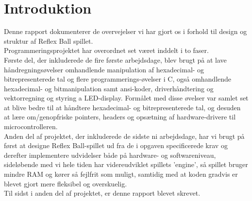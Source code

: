 \chapter{Introduktion}
Denne rapport dokumenterer de overvejelser vi har gjort os i forhold til design og struktur af Reflex Ball spillet. \\
Programmeringsprojektet har overordnet set været inddelt i to faser.\\

Første del, der inkluderede de fire første arbejdsdage, blev brugt på at lave håndregningsøvelser omhandlende manipulation af hexadecimal- og bitrepresenterede tal og flere programmerings-øvelser i C, også omhandlende hexadecimal- og bitmanipulation samt ansi-koder, driverhåndtering og vektorregning og styring a LED-display. Formålet med disse øvelser var samlet set at blive bedre til at håndtere hexadecimal- og bitrepresenterede tal, og desuden at lære om/genopfriske pointers, headers og opsætning af hardware-drivere til microcontrolleren.\\

Anden del af projektet, der inkluderede de sidste ni arbejdsdage, har vi brugt på først at designe Reflex Ball-spillet ud fra de i opgaven specificerede krav og derefter implementere udvidelser både på hardware- og softwareniveau, sideløbende med vi hele tiden har videreudviklet spillets 'engine', så spillet bruger mindre RAM og kører så fejlfrit som muligt, samtidig med at koden gradvis er blevet gjort mere fleksibel og overskuelig.\\
Til sidst i anden del af projektet, er denne rapport blevet skrevet.
